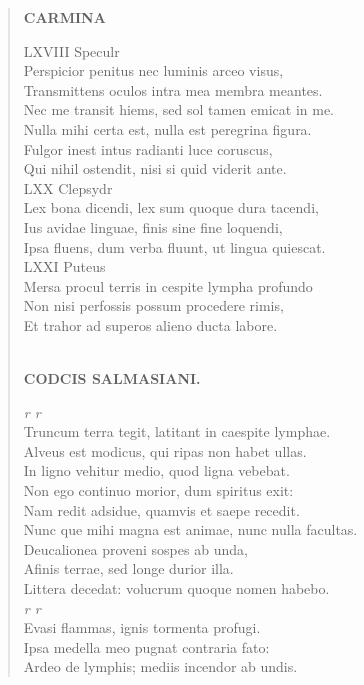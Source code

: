 \documentclass[11pt, a4paper]{report}
\begin{document}
\begin{verse}
    \begin{center} \textbf{CARMINA} \end{center} \marginpar{[238]} LXVIII Speculr \\ Perspicior penitus nec luminis arceo visus, \\ Transmittens oculos intra mea membra meantes. \\ Nec me transit hiems, sed sol tamen emicat in me. \\ Nulla mihi certa est, nulla est peregrina figura. \\ Fulgor inest intus radianti luce coruscus, \\ Qui nihil ostendit, nisi  \lbrack si \rbrack  quid viderit ante. \\ LXX Clepsydr \\ Lex bona dicendi, lex sum quoque dura tacendi, \\ Ius avidae linguae, finis sine fine loquendi, \\ Ipsa fluens, dum verba fluunt, ut lingua quiescat. \\ LXXI Puteus \\ Mersa procul terris in cespite lympha profundo \\ Non nisi perfossis possum procedere rimis, \\ Et trahor ad superos alieno ducta labore. \\ 
        ﻿\pagebreak 
    \begin{center} \textbf{CODCIS SALMASIANI.} \end{center} \marginpar{[239]} \textit{r r} \\ Truncum terra tegit, latitant in caespite lymphae. \\ Alveus est modicus, qui ripas non habet ullas. \\ In ligno vehitur medio, quod ligna vebebat. \\ Non ego continuo morior, dum spiritus exit: \\ Nam redit adsidue, quamvis et saepe recedit. \\ Nunc \lbrack que \rbrack  mihi magna est animae, nunc nulla facultas. \\ Deucalionea proveni sospes ab unda, \\ Afinis terrae, sed longe durior illa. \\ Littera decedat: volucrum quoque nomen habebo. \\ \textit{r r} \\ Evasi flammas, ignis tormenta profugi. \\ Ipsa medella meo pugnat contraria fato: \\ Ardeo de lymphis; mediis incendor ab undis. \\ 

\end{verse}
\end{document}
